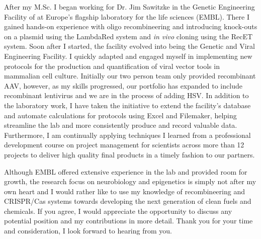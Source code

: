 \documentclass[11pt,a4paper,sans]{moderncv}
\begin{document}
\begin{spacing}{1.1}
After my M.Sc. I began working for Dr. Jim Sawitzke in the Genetic Engineering Facility of at Europe's flagship laboratory for the life sciences (EMBL). There I gained hands-on experience with oligo recombineering and introducing knock-outs on a plasmid using the LambdaRed system and \textit{in vivo} cloning using the RecET system.
Soon after I started, the facility evolved into being the Genetic and Viral Engineering Facility. I quickly adapted and engaged myself in implementing new protocols for the production and quantification of viral vector tools in mammalian cell culture. 	
Initially our two person team only provided recombinant AAV, however, as my skills progressed, our portfolio has expanded to include recombinant lentivirus and we are in the process of adding HSV.
In addition to the laboratory work, I have taken the initiative to extend the facility's database and automate calculations for protocols using Excel and Filemaker, helping streamline the lab and more consistently produce and record valuable data. 
Furthermore, I am continually applying techniques I learned from a professional development course on project management for scientists across more than 12 projects to deliver high quality final products in a timely fashion to our partners.\par%

Although EMBL offered extensive experience in the lab and provided room for growth, the research focus on neurobiology and epigenetics is simply not after my own heart and I would rather like to use my knowledge of recombineering and CRISPR/Cas systems towards developing the next generation of clean fuels and chemicals.
If you agree, I would appreciate the opportunity to discuss any potential position and my contributions in more detail. 
Thank you for your time and consideration, I look forward to hearing from you.
 

 

\end{spacing}
\makeletterclosing
\end{document}

